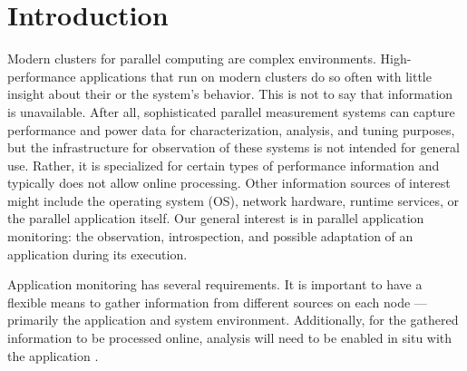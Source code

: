 %
%
\section{Introduction}
%
Modern clusters for parallel computing are complex environments.
%
High-performance applications that run on modern clusters do so often with
little insight about their or the system's behavior.
%
This is not to say that information is unavailable. 
%
After all, sophisticated parallel measurement systems can capture performance and
power data for characterization, analysis, and tuning purposes, but
the infrastructure for observation of these systems is not intended
for general use.
%
Rather, it is specialized for certain types of performance information
and typically does not allow online processing.
%
Other information sources of interest might include the
operating system (OS), network hardware, runtime services, or the
parallel application itself.
%
Our general interest is in parallel application monitoring: the
observation, introspection, and possible adaptation of an application
during its execution.
%
\par
%
Application monitoring has several requirements.
%
%
It is important to have a flexible means to gather information from
different sources on each node --- primarily the application and
system environment.
%
%
Additionally, for the gathered information to be processed online,
analysis will need to be enabled in situ with the application
\cite{da2014architecture}.
%
